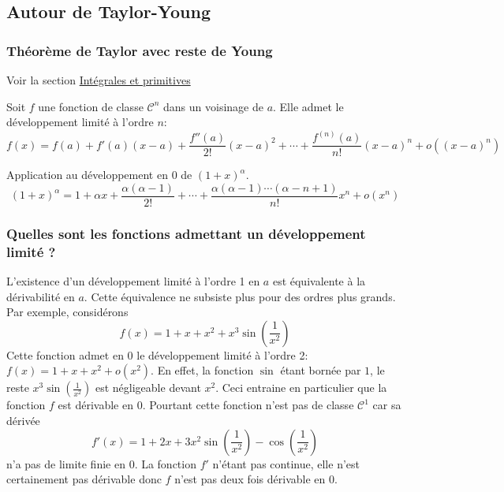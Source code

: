 \subsection{Autour de Taylor-Young}
\subsubsection{Théorème de Taylor avec reste de Young}
Voir la section \href{\baseurl C2190.pdf}{Intégrales et primitives}
\begin{prop}
Soit $f$ une fonction de classe $\mathcal{C}^n$ dans un voisinage de $a$. Elle admet le développement limité à l'ordre $n$:
\begin{displaymath}
f(x) = f(a) + f'(a)(x-a)+\frac{f''(a)}{2!}(x-a)^2 + \cdots + \frac{f^{(n)}(a)}{n!}(x-a)^n + o((x-a)^n)
\end{displaymath}
\end{prop}

Application au développement en $0$ de $(1+x)^\alpha$.
\begin{displaymath}
(1+x)^{\alpha} = 1 + \alpha x + \frac{\alpha(\alpha -1)}{2!} + \cdots + 
\frac{\alpha(\alpha -1)\cdots(\alpha -n +1)}{n!} x^n + o(x^n)
\end{displaymath}

\subsubsection{Quelles sont les fonctions admettant un développement limité ?}
L'existence d'un développement limité à l'ordre 1 en $a$ est équivalente à la dérivabilité en $a$. Cette équivalence ne subsiste plus pour des ordres plus grands. Par exemple, considérons
\begin{displaymath}
 f(x) = 1+x+x^2 + x^3\sin(\frac{1}{x^2})
\end{displaymath}
Cette fonction admet en $0$ le développement limité à l'ordre 2: $f(x)=1+x+x^2+o(x^2)$. En effet, la fonction $\sin$ étant bornée par $1$, le reste $x^3\sin(\frac{1}{x^2})$ est négligeable devant $x^2$. Ceci entraine en particulier que la fonction $f$ est dérivable en $0$. Pourtant cette fonction n'est pas de classe $\mathcal C^1$ car sa dérivée
\begin{displaymath}
 f'(x)= 1+2x+3x^2\sin(\frac{1}{x^2}) - \cos(\frac{1}{x^2})
\end{displaymath}
n'a pas de limite finie en $0$. La fonction $f'$ n'étant pas continue, elle n'est certainement pas dérivable donc $f$ n'est pas deux fois dérivable en $0$.

